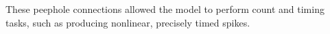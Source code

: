 These peephole connections allowed the model to perform count and timing tasks,
such as producing nonlinear, precisely timed spikes.
\begin{center}
    
    \parbox{0.9\textwidth}{%
    }
\end{center}




